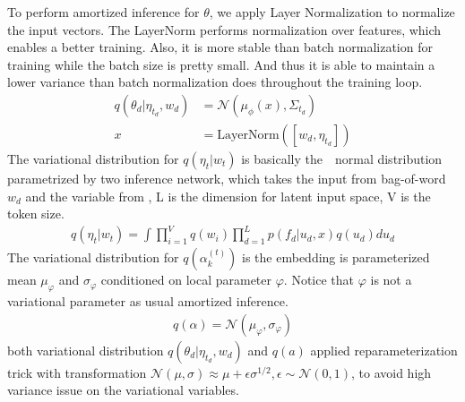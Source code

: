 To perform amortized inference for $ \theta $, we apply Layer Normalization\cite{ba_layer_2016} to normalize the input vectors. The LayerNorm performs normalization over features, which enables a better training. Also, it is more stable than batch normalization for training while the batch size is pretty small. And thus it is able to maintain a lower variance than batch normalization does throughout the training loop.
\begin{align}\label{eq:ch5_variational_theta}
q(\theta_d|\eta_{t_d},w_d)&=\mathcal{N}(\mu_\phi(x),\Sigma_{t_d})\\
x&=\text{LayerNorm}([w_d,\eta_{t_d}])
\end{align}
The variational distribution for $ q(\eta_t|w_t) $ is basically the　normal distribution parametrized by two inference network, which takes the input from bag-of-word $ w_d $ and the variable from \cite{lawrence_learning_2007}, L is the dimension for latent input space, V is the token size.
\begin{align*}
q(\eta_t|w_t)=\int\prod_{i=1}^{V}q(w_i)\prod_{d=1}^{L}p(f_d|u_d,x)q(u_d)du_d
\end{align*}
The variational distribution for $ q(\alpha_k^{(t)}) $ is the embedding is parameterized mean $ \mu_{\varphi} $ and $ \sigma_{\varphi} $ conditioned on local parameter $ \varphi $. Notice that $ \varphi $ is not a variational parameter as usual amortized inference.
\begin{align}
q(\alpha)=\mathcal{N}(\mu_\varphi,\sigma_\varphi)
\end{align}
both variational distribution $ q(\theta_d|\eta_{t_d}, w_d) $ and $ q(a) $ applied reparameterization trick \cite{kingma_auto-encoding_2014} with transformation $ \mathcal{N}(\mu,\sigma)\approx\mu+\epsilon\sigma^{1/2}, \epsilon\sim \mathcal{N}(0,1) $, to avoid high variance issue on the variational variables.
